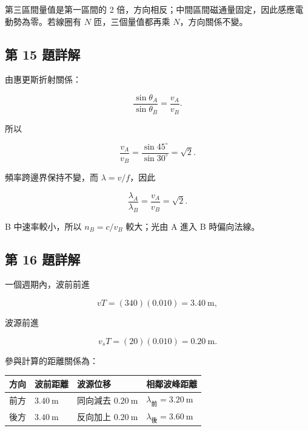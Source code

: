 \documentclass[11pt,a4paper]{article}
\newcounter{none}
\begin{document}
第三區間量值是第一區間的 2 倍，方向相反；中間區間磁通量固定，因此感應電動勢為零。若線圈有 \(N\) 匝，三個量值都再乘 \(N\)，方向關係不變。

\subsection{第 15 題詳解}\label{ux7b2c-15-ux984cux8a73ux89e3}

由惠更斯折射關係：

\[
\frac{\sin\theta_A}{\sin\theta_B}
=\frac{v_A}{v_B}.
\]

所以

\[
\frac{v_A}{v_B}
=\frac{\sin45^\circ}{\sin30^\circ}
=\sqrt2.
\]

頻率跨邊界保持不變，而 \(\lambda=v/f\)，因此

\[
\frac{\lambda_A}{\lambda_B}
=\frac{v_A}{v_B}
=\sqrt2.
\]

B 中速率較小，所以 \(n_B=c/v_B\) 較大；光由 A 進入 B 時偏向法線。

\subsection{第 16 題詳解}\label{ux7b2c-16-ux984cux8a73ux89e3}

一個週期內，波前前進

\[
vT=(340)(0.010)=3.40\ \mathrm m,
\]

波源前進

\[
v_sT=(20)(0.010)=0.20\ \mathrm m.
\]

參與計算的距離關係為：

{\def\LTcaptype{none} %
\begin{longtable}[]{@{}
  >{\raggedright\arraybackslash}p{}
  >{\raggedleft\arraybackslash}p{}
  >{\raggedleft\arraybackslash}p{}
  >{\raggedleft\arraybackslash}p{}@{}}
\toprule\noalign{}
\begin{minipage}[b]{\linewidth}\raggedright
方向
\end{minipage} & \begin{minipage}[b]{\linewidth}\raggedleft
波前距離
\end{minipage} & \begin{minipage}[b]{\linewidth}\raggedleft
波源位移
\end{minipage} & \begin{minipage}[b]{\linewidth}\raggedleft
相鄰波峰距離
\end{minipage} \\
\midrule\noalign{}
\endhead
\bottomrule\noalign{}
\endlastfoot
前方 & \(3.40\ \mathrm m\) & 同向減去 \(0.20\ \mathrm m\) & \(\lambda_{\text{前}}=3.20\ \mathrm m\) \\
後方 & \(3.40\ \mathrm m\) & 反向加上 \(0.20\ \mathrm m\) & \(\lambda_{\text{後}}=3.60\ \mathrm m\) \\
\end{longtable}
}
\end{document}
